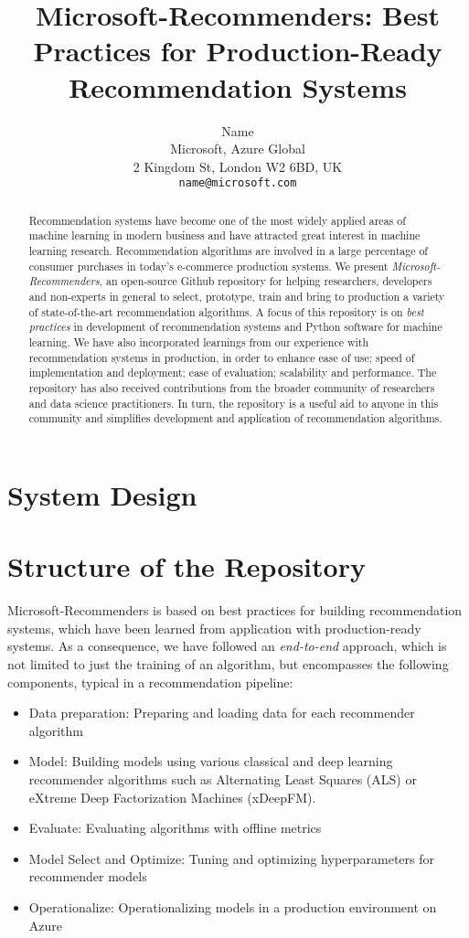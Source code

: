 \documentclass{article}
\title{Microsoft-Recommenders: Best Practices for Production-Ready Recommendation Systems}
\author{%
  Name \\
  Microsoft, Azure Global \\
  2 Kingdom St, London W2 6BD, UK \\
  \texttt{name@microsoft.com} \\
}
\begin{document}
\maketitle

\begin{abstract}
Recommendation systems have become one of the most widely applied areas of machine learning in modern business and 
have attracted great interest in machine learning research. Recommendation algorithms are involved in a large percentage of 
consumer purchases in today's e-commerce production systems. We present {\em Microsoft-Recommenders},  
an open-source Github repository for helping researchers, developers and non-experts in general to select, prototype, train and
bring to production a variety of state-of-the-art recommendation algorithms.
A focus of this repository is on {\em best practices} in development of recommendation systems and Python software for machine learning.
We have also incorporated learnings from our experience with recommendation systems in production, in order to enhance ease of use; speed of 
implementation and deployment; ease of evaluation; scalability and performance. 
The repository has also received contributions from the broader community of researchers and data science practitioners. 
In turn, the repository is a useful aid to anyone in this community and simplifies development and application of recommendation algorithms.
\end{abstract}





\section{System Design}


\section{Structure of the Repository}

Microsoft-Recommenders is based on best practices for building recommendation systems, which have been learned from application with production-ready systems.
As a consequence, we have followed an {\em end-to-end} approach, which is not limited to just the training of an algorithm, but encompasses the following components, typical in a recommendation pipeline:

\begin{itemize}
\item Data preparation: Preparing and loading data for each recommender algorithm
\item Model: Building models using various classical and deep learning recommender algorithms such as Alternating Least Squares (ALS) or eXtreme Deep Factorization Machines (xDeepFM).
\item Evaluate: Evaluating algorithms with offline metrics
\item Model Select and Optimize: Tuning and optimizing hyperparameters for recommender models
\item Operationalize: Operationalizing models in a production environment on Azure
\end{itemize}
\end{document}
